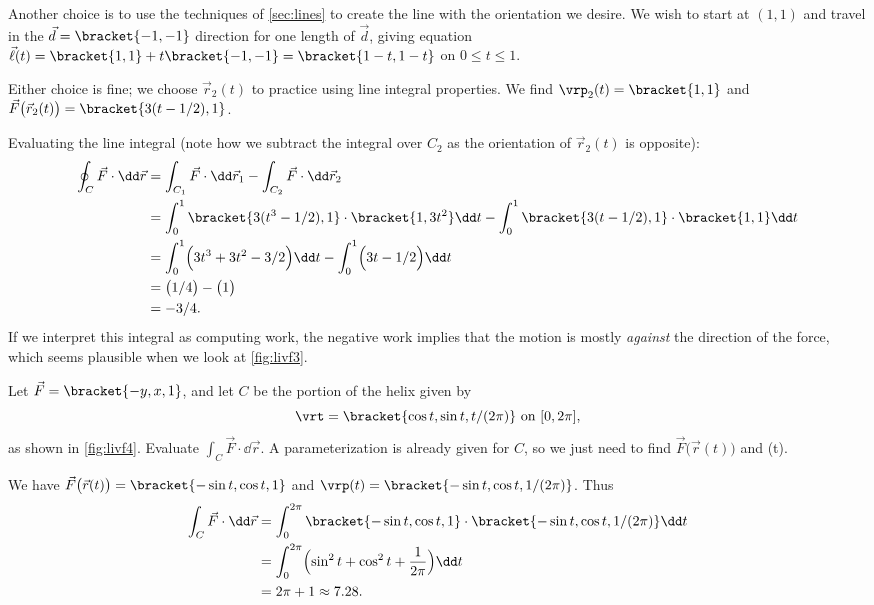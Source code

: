 \begin{example}
Another choice is to use the techniques of \autoref{sec:lines} to create the line with the orientation we desire. We wish to start at $( 1,1)$ and travel in the $\vec d =\bracket{-1,-1}$ direction for one length of $\vec d$, giving equation $\vec \ell(t) =\bracket{1,1} + t\bracket{-1,-1} =\bracket{1-t,1-t}$ on $0\leq t\leq 1$.

Either choice is fine; we choose $\vec r_2(t)$ to practice using line integral properties. We find $\vrp_2(t) =\bracket{1,1}$ and $\vec F\bigl(\vec r_2(t)\bigr) =\bracket{3(t-1/2),1}$.

Evaluating the line integral (note how we subtract the integral over $C_2$ as the orientation of $\vec r_2(t)$ is opposite):
\begin{align*}
	\oint_C \vec F\cdot\dd\vec r
	&= \int_{C_1}\vec F\cdot\dd\vec r_1 - \int_{C_2}\vec F\cdot\dd\vec r_2 \\
	&= \int_0^1\bracket{3(t^3-1/2),1}\cdot\bracket{1,3t^2}\dd t
	- \int_0^1\bracket{3(t-1/2),1}\cdot\bracket{1,1}\dd t \\
	&= \int_0^1\Bigl(3t^3+3t^2-3/2\Bigr)\dd t - \int_0^1 \Bigl(3t-1/2\Bigr)\dd t\\
	&= \bigl(1/4 \bigr) - \bigl(1\bigr)\\
	&=	-3/4.
\end{align*}
If we interpret this integral as computing work, the negative work implies that the motion is mostly \emph{against} the direction of the force, which seems plausible when we look at \autoref{fig:livf3}.
\end{example}


\begin{example}\label{ex_livf4}%
Let $\vec F =\bracket{-y,x,1}$, and let $C$ be the portion of the helix given by \[\vrt = \bracket{ \cos t,\sin t, t/(2\pi)}\text{ on }[0,2\pi],\]
as shown in \autoref{fig:livf4}. Evaluate $\int_C\vec F\cdot\dd\vec r$.
\solution
A parameterization is already given for $C$, so we just need to find $\vec F\bigl(\vec r(t)\bigr)$ and \vrp(t). 

We have $\vec F\bigl(\vec r(t)\bigr) =\bracket{-\sin t, \cos t, 1}$ and $\vrp(t) =\bracket{-\sin t, \cos t, 1/(2\pi)}$. Thus
\begin{align*}
	\int_C \vec F\cdot\dd\vec r
	&= \int_0^{2\pi}\bracket{-\sin t, \cos t, 1}\cdot\bracket{-\sin t, \cos t, 1/(2\pi)}\dd t\\
	&= \int_0^{2\pi} \Bigl(\sin^2t+\cos^2t + \frac1{2\pi}\Bigr)\dd t\\
	&= 2\pi + 1 \approx 7.28.
\end{align*}
\end{example}

